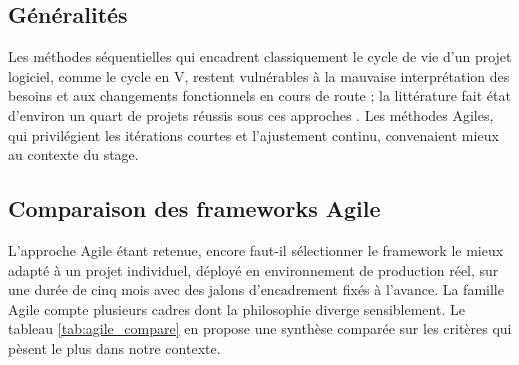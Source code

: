     \subsection{Généralités}

        Les méthodes séquentielles qui encadrent classiquement le cycle de vie d'un
        projet logiciel, comme le cycle en V, restent vulnérables à la mauvaise
        interprétation des besoins et aux changements fonctionnels en cours de route ;
        la littérature fait état d'environ un quart de projets réussis sous ces
        approches \cite{Agile}. Les méthodes Agiles, qui privilégient les itérations
        courtes et l'ajustement continu, convenaient mieux au contexte du stage.

    \subsection{Comparaison des frameworks Agile}

        L'approche Agile étant retenue, encore faut-il sélectionner le framework le mieux
        adapté à un projet individuel, déployé en
        environnement de production réel, sur une durée de cinq mois avec des
        jalons d'encadrement fixés à l'avance. La famille Agile compte plusieurs
        cadres dont la philosophie diverge sensiblement. Le tableau
        \ref{tab:agile_compare} en propose une synthèse comparée sur les critères
        qui pèsent le plus dans notre contexte.

